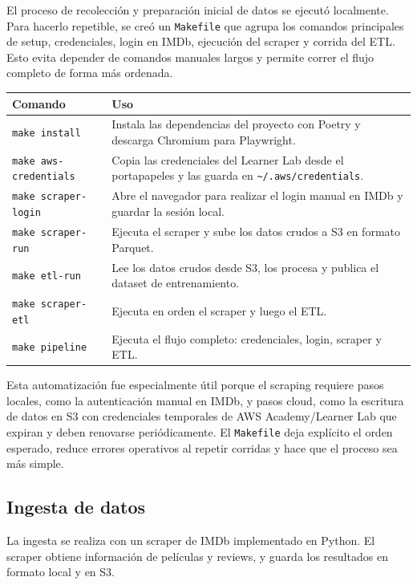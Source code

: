 \documentclass[letterpaper,12pt]{article}
\begin{document}
El proceso de recolección y preparación inicial de datos se ejecutó localmente. Para hacerlo repetible, se creó un \texttt{Makefile} que agrupa los comandos principales de setup, credenciales, login en IMDb, ejecución del scraper y corrida del ETL. Esto evita depender de comandos manuales largos y permite correr el flujo completo de forma más ordenada.


\begin{longtable}{p{4cm}p{12cm}}
\toprule
\textbf{Comando} & \textbf{Uso} \\
\midrule
\texttt{make install} & Instala las dependencias del proyecto con Poetry y descarga Chromium para Playwright. \\
\texttt{make aws-credentials} & Copia las credenciales del Learner Lab desde el portapapeles y las guarda en \texttt{\textasciitilde{}/.aws/credentials}. \\
\texttt{make scraper-login} & Abre el navegador para realizar el login manual en IMDb y guardar la sesión local. \\
\texttt{make scraper-run} & Ejecuta el scraper y sube los datos crudos a S3 en formato Parquet. \\
\texttt{make etl-run} & Lee los datos crudos desde S3, los procesa y publica el dataset de entrenamiento. \\
\texttt{make scraper-etl} & Ejecuta en orden el scraper y luego el ETL. \\
\texttt{make pipeline} & Ejecuta el flujo completo: credenciales, login, scraper y ETL. \\
\bottomrule
\end{longtable}

Esta automatización fue especialmente útil porque el scraping requiere pasos locales, como la autenticación manual en IMDb, y pasos cloud, como la escritura de datos en S3 con credenciales temporales de AWS Academy/Learner Lab que expiran y deben renovarse periódicamente. El \texttt{Makefile} deja explícito el orden esperado, reduce errores operativos al repetir corridas y hace que el proceso sea más simple.

\subsection{Ingesta de datos}

La ingesta se realiza con un scraper de IMDb implementado en Python. El scraper obtiene información de películas y reviews, y guarda los resultados en formato local y en S3.
\end{document}
